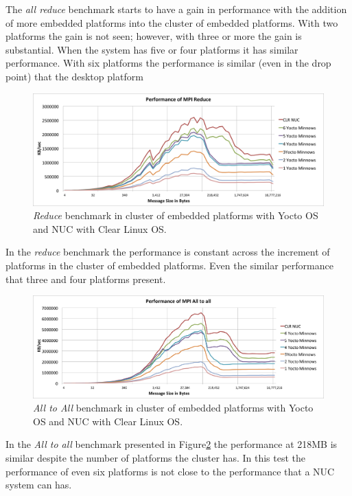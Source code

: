The \textit{all reduce} benchmark starts to have a gain in performance with the
addition of more embedded platforms into the cluster of embedded platforms.
With two platforms the gain is not seen; however, with three or more the gain is
substantial.  When the system has five or four platforms it has similar
performance. With six platforms the performance is similar (even in the drop
point) that the desktop platform \cite{NUC}

\begin{figure}
  \includegraphics[width=\paperwidth]{images/mpbench_cluster_experiments/mpi_reduce.png}
\caption{\textit{Reduce} benchmark in cluster of embedded platforms with Yocto OS and NUC
with Clear Linux OS.}
\label{reduce_cluster}
\end{figure}

In the \textit{reduce} benchmark the performance is constant across the
increment of platforms in the cluster of embedded platforms. Even the similar
performance that three and four platforms present.

\begin{figure}
  \includegraphics[width=\paperwidth]{images/mpbench_cluster_experiments/mpi_alltoall.png}
\caption{\textit{All to All} benchmark in cluster of embedded platforms with Yocto OS and NUC
with Clear Linux OS.}
\label{all_to_all_cluster}
\end{figure}

In the \textit{All to all} benchmark presented in
Figure\ref{all_to_all_cluster} the performance at 218MB is similar despite the
number of platforms the cluster has. In this test the performance of even six
platforms is not close to the performance that a NUC \cite{NUC} system can has.

